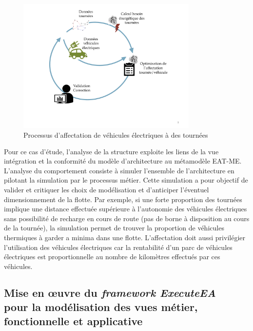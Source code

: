     \begin{figure}[!htbp]
      \centering
      \includegraphics[trim=0cm 3cm 0cm 0cm, clip, width=0.8\textwidth]{figures/5_implementation/processus_metier.pdf}
     \caption{Processus d'affectation de véhicules électriques à des tournées}
     \label{fig:processus_metier}
    \end{figure}

    Pour ce cas d'étude, l'analyse de la structure exploite les liens de la vue
    intégration et la conformité du modèle d'architecture au métamodèle EAT-ME.
    L'analyse du comportement consiste à simuler l'ensemble de l'architecture en
    pilotant la simulation par le processus métier. Cette simulation a pour
    objectif de valider et critiquer  les choix de modélisation et d'anticiper
    l'éventuel dimensionnement de la flotte. Par exemple, si une forte
    proportion des tournées implique une distance effectuée supérieure à
    l'autonomie des véhicules électriques sans possibilité de recharge en cours
    de route (pas de borne à disposition au cours de la tournée), la simulation
    permet  de trouver la proportion de véhicules thermiques à garder a minima
    dans une flotte. L'affectation doit aussi privilégier l'utilisation des
    véhicules électriques car la rentabilité d'un parc de véhicules électriques
    est proportionnelle au nombre de kilomètres effectués par ces véhicules.

    \subsection{Mise en œuvre du \emph{framework ExecuteEA}\\
    pour la modélisation des vues métier, fonctionnelle et applicative}

